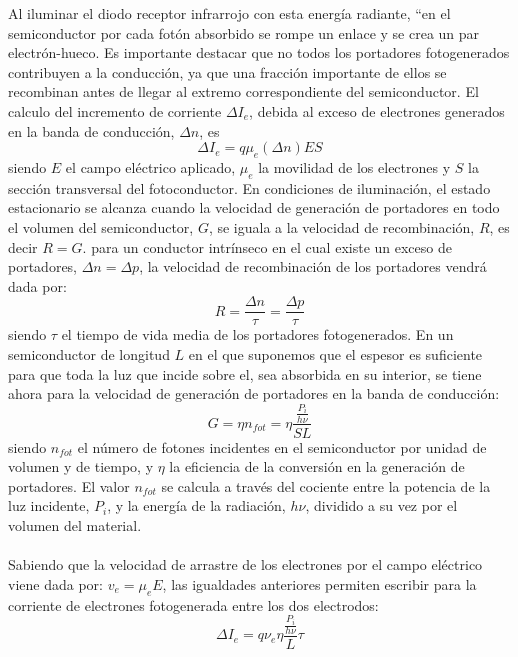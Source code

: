 \documentclass[12]{article}
\begin{document}
\begin{multicols}{2}
Al iluminar el diodo receptor infrarrojo con esta energía radiante, ``en el semiconductor por cada fotón absorbido se rompe un enlace y se crea un par electrón-hueco. 
Es importante destacar que no todos los portadores fotogenerados contribuyen a la conducción, ya que una fracción importante de ellos se recombinan antes de llegar al extremo correspondiente del semiconductor. El calculo del incremento de corriente $\Delta I_{e}$, debida al exceso de electrones generados en la banda de conducción, $\Delta n$, es
\begin {equation}
\Delta I_{e} = q\mu _{e}(\Delta n)ES
\end{equation} 
siendo $E$ el campo eléctrico aplicado, $\mu_{e}$ la movilidad de los electrones y $S$ la sección transversal del fotoconductor. En condiciones de iluminación, el estado estacionario se alcanza cuando la velocidad de generación de portadores en todo el volumen del semiconductor, $G$, se iguala a la velocidad de recombinación, $R$, es decir $R = G$. para un conductor intrínseco en el cual existe un exceso de portadores, $\Delta n = \Delta p$, la velocidad de recombinación de los portadores vendrá dada por:
\begin{equation}
R = \frac{\Delta n }{\tau} = \frac{\Delta p}{\tau}
\end{equation}
siendo $\tau$ el tiempo de vida media de los portadores fotogenerados. En un semiconductor de longitud $L$ en el que suponemos que el espesor es suficiente para que toda la luz que incide sobre el, sea absorbida en su interior, se tiene ahora para la velocidad de generación de portadores en la banda de conducción:
\begin{equation}
G = \eta n_{fot} = \eta \frac{\frac{P_{i}}{h\nu}}{SL}
\end{equation}
siendo $n_{fot}$ el número de fotones incidentes en el semiconductor por unidad de volumen y de tiempo, y $\eta$ la eficiencia de la conversión en la generación de portadores. El valor $n_{fot}$ se calcula a través del cociente entre la potencia de la luz incidente, $P_{i}$, y la energía de la radiación, $h\nu$, dividido a su vez por el volumen del material.\\ \\
Sabiendo que la velocidad de arrastre de los electrones por el campo eléctrico viene dada por: $v_{e} = \mu_{e}E$, las igualdades anteriores permiten escribir para la corriente de electrones fotogenerada entre los dos electrodos:
\begin{equation}
\Delta I_{e} = q\nu_{e}\eta\frac{\frac{P_{i}}{h\nu}}{L}\tau

\end{equation}
\end{multicols}
\end{document}
